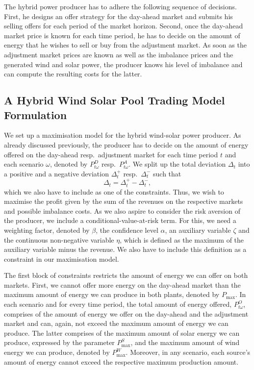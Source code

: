 The hybrid power producer has to adhere the following sequence of decisions. First, he designs an offer strategy for the day-ahead market and submits his selling offers for each period of the market horizon. Second, once the day-ahead market price is known for each time period, he has to decide on the amount of energy that he wishes to sell or buy from the adjustment market. As soon as the adjustment market prices are known as well as the imbalance prices and the generated wind and solar power, the producer knows his level of imbalance and can compute the resulting costs for the latter.



\subsection{ A Hybrid Wind Solar Pool Trading Model Formulation}
We set up a maximisation model for the hybrid wind-solar power producer. As already discussed previously, the producer has to decide on the amount of energy offered on the day-ahead resp.\ adjustment market for each time period $t$ and each scenario $\omega$, denoted by $P^{D}_{t \omega}$ resp.\ $P^{A}_{t \omega}$. We split up the total deviation $\Delta_{t}$ into a positive and a negative deviation $\Delta_{t}^{+}$ resp.\ $\Delta_{t}^{-}$ such that
\begin{equation*}
	\Delta_{t}=\Delta_{t}^{+}-\Delta_{t}^{-},
\end{equation*}
which we also have to include as one of the constraints. Thus, we wish to maximise the profit given by the sum of the revenues on the respective markets and possible imbalance costs. As we also aspire to consider the risk aversion of the producer, we include a conditional-value-at-risk term. For this, we need a weighting factor, denoted by $\beta$, the confidence level $\alpha$, an auxiliary variable $\zeta$ and the continuous non-negative variable $\eta$, which is defined as the maximum of the auxiliary variable minus the revenue. We also have to include this definition as a constraint in our maximisation model. 

The first block of constraints restricts the amount of energy we can offer on both markets. First, we cannot offer more energy on the day-ahead market than the maximum amount of energy we can produce in both plants, denoted by $P_{\max}$. In each scenario and for every time period, the total amount of energy offered, $P^{O}_{t \omega}$, comprises of the amount of energy we offer on the day-ahead and the adjustment market and can, again, not exceed the maximum amount of energy we can produce. The latter comprises of the maximum amount of solar energy we can produce, expressed by the parameter $P_{\max}^{S}$, and the maximum amount of wind energy we can produce, denoted by $P_{\max}^{W}$. Moreover, in any scenario, each source's amount of energy cannot exceed the respective maximum production amount. 


